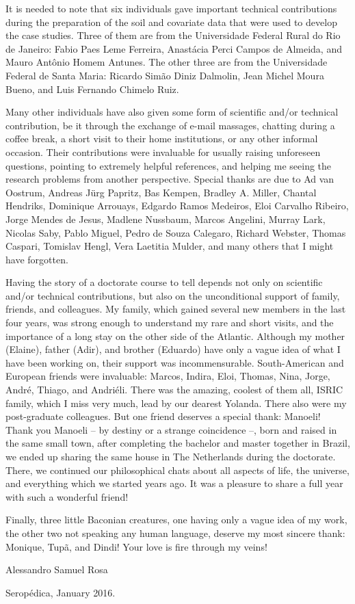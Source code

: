 It is needed to note that six individuals gave important technical contributions during the preparation of 
the soil and covariate data that were used to develop the case studies. Three of them are from the Universidade 
Federal Rural do Rio de Janeiro: Fabio Paes Leme Ferreira, Anastácia Perci Campos de Almeida, and Mauro Antônio 
Homem Antunes. The other three are from the Universidade Federal de Santa Maria: Ricardo Simão Diniz Dalmolin, 
Jean Michel Moura Bueno, and Luis Fernando Chimelo Ruiz.

Many other individuals have also given some form of scientific and/or technical contribution, be it through 
the exchange of e-mail massages, chatting during a coffee break, a short visit to their home institutions, or 
any other informal occasion. Their contributions were invaluable for usually raising unforeseen questions, 
pointing to extremely helpful references, and helping me seeing the research problems from another perspective.
Special thanks are due to Ad van Oostrum, Andreas Jürg Papritz, Bas Kempen, Bradley A. Miller, Chantal 
Hendriks, Dominique Arrouays, Edgardo Ramos Medeiros, Eloi Carvalho Ribeiro, Jorge Mendes de Jesus, Madlene 
Nussbaum, Marcos Angelini, Murray Lark, Nicolas Saby, Pablo Miguel, Pedro de Souza Calegaro, Richard Webster, 
Thomas Caspari, Tomislav Hengl, Vera Laetitia Mulder, and many others that I might have forgotten.

Having the story of a doctorate course to tell depends not only on scientific and/or technical contributions,
but also on the unconditional support of family, friends, and colleagues. My family, which gained several new 
members in the last four years, was strong enough to understand my rare and short visits, and the importance of 
a long stay on the other side of the Atlantic. Although my mother (Elaine), father (Adir), and brother 
(Eduardo) have only a vague idea of what I have been working on, their support was incommensurable. 
South-American and European friends were invaluable: Marcos, Indira, Eloi, Thomas, Nina, Jorge, André, Thiago, 
and Andriéli. There was the amazing, coolest of them all, ISRIC family, which I miss very much, lead by 
our dearest Yolanda. There also were my post-graduate colleagues. But one friend deserves a special thank: 
Manoeli! Thank you Manoeli -- by destiny or a strange coincidence --, born and raised in the same small town, 
after completing the bachelor and master together in Brazil, we ended up sharing the same house in The 
Netherlands during the doctorate. There, we continued our philosophical chats about all aspects of life, the 
universe, and everything which we started years ago. It was a pleasure to share a full year with such a 
wonderful friend!

Finally, three little Baconian creatures, one having only a vague idea of my work, the other two not speaking 
any human language, deserve my most sincere thank: Monique, Tupã, and Dindi! Your love is fire through my 
veins!

\begin{flushright}
 Alessandro Samuel Rosa
 
 Seropédica, January 2016.
\end{flushright}
